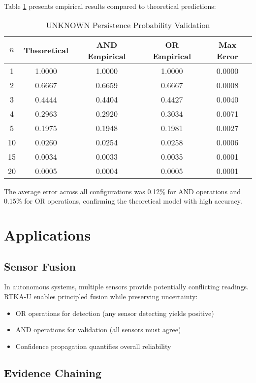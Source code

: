\documentclass[11pt,a4paper]{article}
\begin{document}
Table \ref{tab:validation} presents empirical results compared to theoretical predictions:

\begin{table}[h]
\centering
\caption{UNKNOWN Persistence Probability Validation}
\label{tab:validation}
\begin{tabular}{@{}ccccc@{}}
\toprule
$n$ & Theoretical & AND Empirical & OR Empirical & Max Error \\
\midrule
1 & 1.0000 & 1.0000 & 1.0000 & 0.0000 \\
2 & 0.6667 & 0.6659 & 0.6667 & 0.0008 \\
3 & 0.4444 & 0.4404 & 0.4427 & 0.0040 \\
4 & 0.2963 & 0.2920 & 0.3034 & 0.0071 \\
5 & 0.1975 & 0.1948 & 0.1981 & 0.0027 \\
10 & 0.0260 & 0.0254 & 0.0258 & 0.0006 \\
15 & 0.0034 & 0.0033 & 0.0035 & 0.0001 \\
20 & 0.0005 & 0.0004 & 0.0005 & 0.0001 \\
\bottomrule
\end{tabular}
\end{table}

The average error across all configurations was 0.12\% for AND operations and 0.15\% for OR operations, confirming the theoretical model with high accuracy.

\section{Applications}

\subsection{Sensor Fusion}

In autonomous systems, multiple sensors provide potentially conflicting readings. RTKA-U enables principled fusion while preserving uncertainty:

\begin{itemize}
\item OR operations for detection (any sensor detecting yields positive)
\item AND operations for validation (all sensors must agree)
\item Confidence propagation quantifies overall reliability
\end{itemize}

\subsection{Evidence Chaining}
\end{document}
